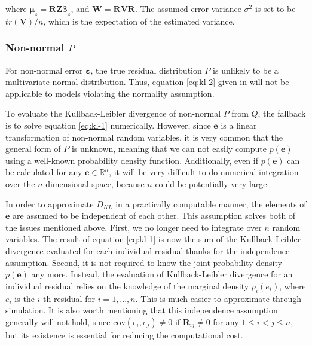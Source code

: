 \documentclass[]{interact}
\theoremstyle{plain}%
\theoremstyle{definition}
\theoremstyle{remark}
\begin{document}
\noindent where
\(\boldsymbol{\mu}_z = \boldsymbol{R}\boldsymbol{Z}\boldsymbol{\beta}_z\),
and \(\boldsymbol{W} = \boldsymbol{R}\boldsymbol{V}\boldsymbol{R}\). The
assumed error variance \(\sigma^2\) is set to be
\(tr(\boldsymbol{V})/n\), which is the expectation of the estimated
variance.

\subsubsection{\texorpdfstring{Non-normal
\(P\)}{Non-normal P}}\label{non-normal-p}

For non-normal error \(\boldsymbol{\varepsilon}\), the true residual
distribution \(P\) is unlikely to be a multivariate normal distribution.
Thus, equation \ref{eq:kl-2} given in \citet{li2023plot} will not be
applicable to models violating the normality assumption.

To evaluate the Kullback-Leibler divergence of non-normal \(P\) from
\(Q\), the fallback is to solve equation \ref{eq:kl-1} numerically.
However, since \(\boldsymbol{e}\) is a linear transformation of
non-normal random variables, it is very common that the general form of
\(P\) is unknown, meaning that we can not easily compute
\(p(\boldsymbol{e})\) using a well-known probability density function.
Additionally, even if \(p(\boldsymbol{e})\) can be calculated for any
\(\boldsymbol{e} \in \mathbb{R}^n\), it will be very difficult to do
numerical integration over the \(n\) dimensional space, because \(n\)
could be potentially very large.

In order to approximate \(D_{KL}\) in a practically computable manner,
the elements of \(\boldsymbol{e}\) are assumed to be independent of each
other. This assumption solves both of the issues mentioned above. First,
we no longer need to integrate over \(n\) random variables. The result
of equation \ref{eq:kl-1} is now the sum of the Kullback-Leibler
divergence evaluated for each individual residual thanks for the
independence assumption. Second, it is not required to know the joint
probability density \(p(\boldsymbol{e})\) any more. Instead, the
evaluation of Kullback-Leibler divergence for an individual residual
relies on the knowledge of the marginal density \(p_i(e_i)\), where
\(e_i\) is the \(i\)-th residual for \(i = 1, ..., n\). This is much
easier to approximate through simulation. It is also worth mentioning
that this independence assumption generally will not hold, since
\(\text{cov}(e_i, e_j) \neq 0\) if \(\boldsymbol{R}_{ij} \neq 0\) for
any \(1 \leq i < j \leq n\), but its existence is essential for reducing
the computational cost.
\end{document}
